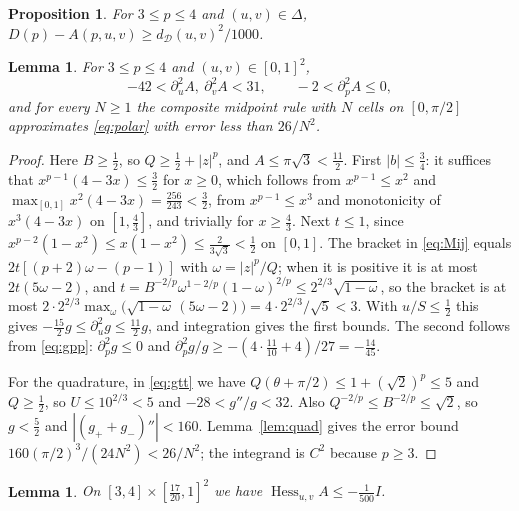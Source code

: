 \documentclass[11pt]{amsart}
\newtheorem{proposition}[theorem]{Proposition}
\newtheorem{lemma}[theorem]{Lemma}
\theoremstyle{definition}
\theoremstyle{remark}
\numberwithin{equation}{section}
\newcommand{\Hess}{\operatorname{Hess}}
\newcommand{\cD}{\mathcal{D}}
\begin{document}
\begin{proposition}\label{prop:34}
For $3\le p\le4$ and $(u,v)\in\Delta$, $D(p)-A(p,u,v)\ge d_\cD(u,v)^2/1000$.
\end{proposition}

\begin{lemma}\label{lem:34constants}
For $3\le p\le4$ and $(u,v)\in[0,1]^2$,
\[
-42<\partial_u^2A,\ \partial_v^2A<31,\qquad -2<\partial_p^2A\le0,
\]
and for every $N\ge1$ the composite midpoint rule with $N$ cells on $[0,\pi/2]$ approximates \eqref{eq:polar} with error less than $26/N^2$.
\end{lemma}

\begin{proof}
Here $B\ge\frac12$, so $Q\ge\frac12+|z|^p$, and $A\le\pi\sqrt3<\frac{11}2$. First $|b|\le\frac34$: it suffices that $x^{p-1}(4-3x)\le\frac32$ for $x\ge0$, which follows from $x^{p-1}\le x^2$ and $\max_{[0,1]}x^2(4-3x)=\frac{256}{243}<\frac32$, from $x^{p-1}\le x^3$ and monotonicity of $x^3(4-3x)$ on $[1,\frac43]$, and trivially for $x\ge\frac43$. Next $t\le1$, since $x^{p-2}(1-x^2)\le x(1-x^2)\le\frac{2}{3\sqrt3}<\frac12$ on $[0,1]$. The bracket in \eqref{eq:Mij} equals $2t[(p+2)\omega-(p-1)]$ with $\omega=|z|^p/Q$; when it is positive it is at most $2t(5\omega-2)$, and $t=B^{-2/p}\omega^{1-2/p}(1-\omega)^{2/p}\le2^{2/3}\sqrt{1-\omega}$, so the bracket is at most ${2\cdot2^{2/3}\max_{\omega}\bigl(\sqrt{1-\omega}\,(5\omega-2)\bigr)}=4\cdot2^{2/3}/\sqrt5<3$. With $u/S\le\frac12$ this gives $-\frac{15}2g\le\partial_u^2g\le\frac{11}2g$, and integration gives the first bounds. The second follows from \eqref{eq:gpp}: $\partial_p^2g\le0$ and $\partial_p^2g/g\ge-(4\cdot\frac{11}{10}+4)/27=-\frac{14}{45}$.

For the quadrature, in \eqref{eq:gtt} we have $Q(\theta+\pi/2)\le1+(\sqrt2)^p\le5$ and $Q\ge\frac12$, so $U\le10^{2/3}<5$ and $-28<g''/g<32$. Also $Q^{-2/p}\le B^{-2/p}\le\sqrt2$, so $g<\frac52$ and $|(g_++g_-)''|<160$. Lemma~\ref{lem:quad} gives the error bound $160(\pi/2)^3/(24N^2)<26/N^2$; the integrand is $C^2$ because $p\ge3$.
\end{proof}

\begin{lemma}\label{lem:34local}
On $[3,4]\times[\frac{17}{20},1]^2$ we have $\Hess_{u,v}A\le-\frac1{500}I$.
\end{lemma}
\end{document}
